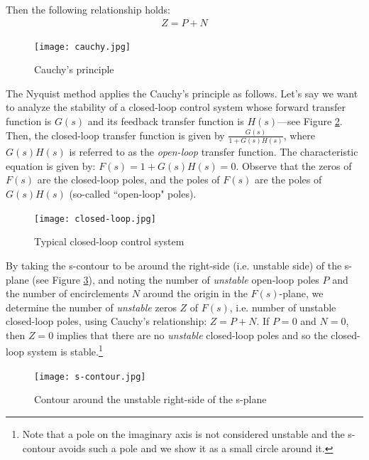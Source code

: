 \documentclass{article}
\begin{document}
Then the following relationship holds:
\begin{eqnarray*}
Z = P + N
\end{eqnarray*}

\begin{figure}[htbp]
   \centering
   \texttt{[image: cauchy.jpg]} %
   \caption{Cauchy's principle}
   \label{fig:cauchy}
\end{figure}

The Nyquist method applies the Cauchy's principle as follows.
Let's say we want to analyze the stability of a closed-loop control system
whose forward transfer function is $G(s)$ and its feedback transfer function is $H(s)$---see Figure \ref{fig:closed-loop}.
Then, the closed-loop transfer function is given by $\frac{G(s)}{1+G(s) H(s)}$,
where $G(s)H(s)$ is referred to as the {\em open-loop} transfer function.
The characteristic equation is given by: $F(s) = 1 + G(s) H(s) = 0$.
Observe that the zeros of $F(s)$ are the closed-loop poles,
and the poles of $F(s)$ are the poles of $G(s)H(s)$ (so-called ``open-loop" poles).
\begin{figure}[htbp]
   \centering
   \texttt{[image: closed-loop.jpg]} %
   \caption{Typical closed-loop control system}
   \label{fig:closed-loop}
\end{figure}

By taking the s-contour to be around the right-side (i.e. unstable side) of the s-plane
(see Figure \ref{fig:s-contour}),
and noting the number of {\em unstable} open-loop poles $P$
and the number of encirclements $N$ around the origin in the $F(s)$-plane, we determine 
the number of {\em unstable} zeros $Z$ of $F(s)$, i.e. number of unstable closed-loop poles,
using Cauchy's relationship: $Z = P + N$.
If $P = 0$ and $N = 0$, then $Z = 0$ implies that there are no {\em unstable} closed-loop poles
and so the closed-loop system is stable.\footnote{
Note that a pole on the imaginary axis is not considered unstable and
the s-contour avoids such a pole and we show it as a small circle around it.
}
\begin{figure}[htbp]
   \centering
   \texttt{[image: s-contour.jpg]} %
   \caption{Contour around the unstable right-side of the s-plane}
   \label{fig:s-contour}
\end{figure}
\end{document}
